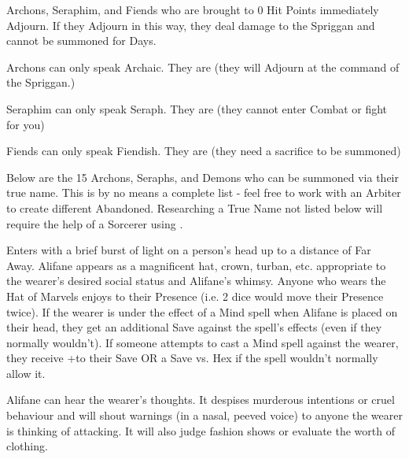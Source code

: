 {Archons, Seraphim, and Fiends who are brought to 0 Hit Points immediately Adjourn.  If they Adjourn in this way, they deal \SUMDICE damage to the Spriggan and cannot be summoned for \DICE Days.


Archons can only speak Archaic.  They are  (they will Adjourn at the command of the Spriggan.)


Seraphim can only speak Seraph.  They are  (they cannot enter Combat or fight for you)


Fiends can only speak Fiendish.  They are  (they need a sacrifice to be summoned)

Below are the 15 Archons, Seraphs, and Demons who can be summoned via their true name.  This is by no means a complete list - feel free to work with an Arbiter to create different Abandoned.  Researching a True Name not listed below will require the help of a Sorcerer using .  

\newpage








Enters with a brief burst of light on a person's head up to a distance of Far Away.  Alifane appears as a magnificent hat, crown, turban, etc. appropriate to the wearer's desired social status and Alifane's whimsy.  Anyone who wears the Hat of Marvels enjoys \DICE \DCUP to their Presence (i.e. 2 dice would move their Presence \DCUP twice).  If the wearer is under the effect of a Mind spell when Alifane is placed on their head, they get an additional Save against the spell's effects (even if they normally wouldn't).  If someone attempts to cast a Mind spell against the wearer, they receive +\DICE to their Save OR a Save vs. Hex if the spell wouldn't normally allow it.

Alifane can hear the wearer's thoughts. It despises murderous intentions or cruel behaviour and will shout warnings (in a nasal, peeved voice) to anyone the wearer is thinking of attacking. It will also judge fashion shows or evaluate the worth of clothing.


}
